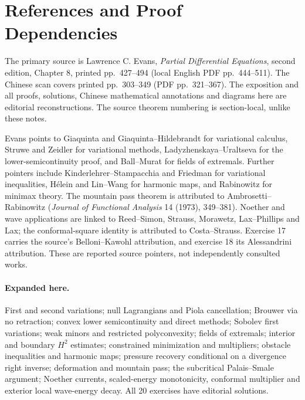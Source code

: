 \Needspace{55mm}
\section{References and Proof Dependencies}
\label{sec:8-8}
The primary source is Lawrence C. Evans, \emph{Partial Differential
Equations}, second edition, Chapter 8, printed pp.~427--494 (local English
PDF pp.~444--511). The Chinese scan covers printed pp.~303--349
(PDF pp.~321--367). The exposition and all proofs, solutions, Chinese
mathematical annotations and diagrams here are editorial reconstructions.
The source theorem numbering is section-local, unlike these notes.

Evans points to Giaquinta and Giaquinta--Hildebrandt for variational
calculus, Struwe and Zeidler for variational methods,
Ladyzhenskaya--Uraltseva for the lower-semicontinuity proof, and Ball--Murat
for fields of extremals. Further pointers include Kinderlehrer--Stampacchia
and Friedman for variational inequalities, H\'elein and Lin--Wang for
harmonic maps, and Rabinowitz for minimax theory.
The mountain pass theorem is attributed to Ambrosetti--Rabinowitz
(\emph{Journal of Functional Analysis} 14 (1973), 349--381).
Noether and wave applications are linked to Reed--Simon, Strauss,
Morawetz, Lax--Phillips and Lax; the conformal-square identity is attributed
to Costa--Strauss. Exercise 17 carries the source's Belloni--Kawohl
attribution, and exercise 18 its Alessandrini attribution.
These are reported source pointers, not independently consulted works.

\paragraph{Expanded here.}
First and second variations; null Lagrangians and Piola cancellation;
Brouwer via no retraction; convex lower semicontinuity and direct methods;
Sobolev first variations; weak minors and restricted polyconvexity;
fields of extremals; interior and boundary $H^2$ estimates; constrained
minimization and multipliers; obstacle inequalities and harmonic maps;
pressure recovery conditional on a divergence right inverse;
deformation and mountain pass; the subcritical Palais--Smale argument;
Noether currents, scaled-energy monotonicity, conformal multiplier and
exterior local wave-energy decay. All 20 exercises have editorial solutions.

